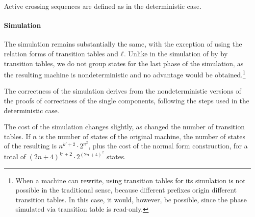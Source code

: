 Active crossing sequences are defined as in the deterministic case.

\paragraph{Simulation} The simulation remains substantially the same, with the exception of using the relation forms of transition tables and $\ell$.
Unlike in the simulation of \TNFA by \ODFA by transition tables, we do not group states for the last phase of the simulation, as the resulting machine is nondeterministic and no advantage would be obtained.\footnote{%
	When a machine can rewrite, using transition tables for its simulation is not possible in the traditional sense, because different prefixes origin different transition tables.
	In this case, it would, however, be possible, since the phase simulated via transition table is read-only.}

The correctness of the simulation derives from the nondeterministic versions of the proofs of correctness of the single components, following the steps used in the deterministic case.

The cost of the simulation changes slightly, as changed the number of transition tables.
If $n$ is the number of states of the original machine, the number of states of the resulting \ONFA is $n^{k'+2}\cdot2^{n^2}$, plus the cost of the normal form construction, for a total of $(2n+4)^{k'+2}\cdot2^{(2n+4)^2}$ states.
